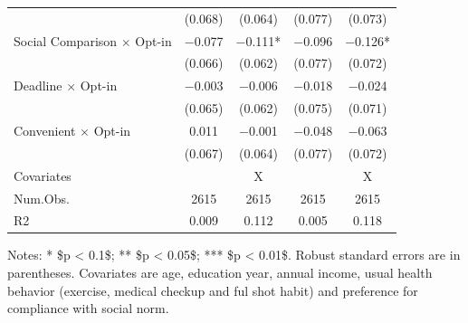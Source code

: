 \documentclass[
]{article}
\begin{document}
\begin{table}
\begin{threeparttable}
\begin{tabular}[t]{lcccc}
 & (\num{0.068}) & (\num{0.064}) & (\num{0.077}) & (\num{0.073})\\
Social Comparison $\times$ Opt-in & \num{-0.077} & \num{-0.111}* & \num{-0.096} & \num{-0.126}*\\
 & (\num{0.066}) & (\num{0.062}) & (\num{0.077}) & (\num{0.072})\\
Deadline $\times$ Opt-in & \num{-0.003} & \num{-0.006} & \num{-0.018} & \num{-0.024}\\
 & (\num{0.065}) & (\num{0.062}) & (\num{0.075}) & (\num{0.071})\\
Convenient $\times$ Opt-in & \num{0.011} & \num{-0.001} & \num{-0.048} & \num{-0.063}\\
 & (\num{0.067}) & (\num{0.064}) & (\num{0.077}) & (\num{0.072})\\
\midrule
Covariates &  & X &  & X\\
Num.Obs. & \num{2615} & \num{2615} & \num{2615} & \num{2615}\\
R2 & \num{0.009} & \num{0.112} & \num{0.005} & \num{0.118}\\
\bottomrule
\end{tabular}
\begin{tablenotes}
\item Notes: * \$p < 0.1\$; ** \$p < 0.05\$; *** \$p < 0.01\$. Robust standard errors are in parentheses. Covariates are age, education year, annual income, usual health behavior (exercise, medical checkup and ful shot habit) and preference for compliance with social norm.
\end{tablenotes}
\end{threeparttable}
\end{table}
\end{document}
